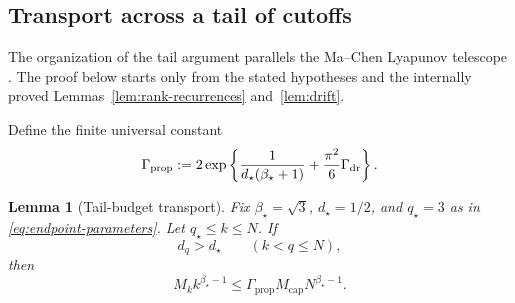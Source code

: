 \documentclass[11pt]{article}
\newtheorem{lemma}[theorem]{Lemma}
\theoremstyle{definition}
\theoremstyle{remark}
\newcommand{\rankmass}{M}
\newcommand{\rankdens}{d}
\newcommand{\criticalexp}{\beta_{\star}}
\newcommand{\threshold}{d_{\star}}
\newcommand{\rankcut}{q_{\star}}
\newcommand{\propconst}{\Gamma_{\mathrm{prop}}}
\begin{document}
\subsection{Transport across a tail of cutoffs}

The organization of the tail argument parallels the Ma--Chen Lyapunov
telescope \cite[Lemma~6.4]{machen2026}.  The proof below starts only from the
stated hypotheses and the internally proved Lemmas~\ref{lem:rank-recurrences}
and~\ref{lem:drift}.

Define the finite universal constant
\begin{equation}
 \propconst
 :=
 2\exp\left\{
 \frac1{\threshold(\criticalexp+1)}
 +\frac{\pi^2}{6}\Gamma_{\rm dr}
 \right\}.
 \label{eq:Ktriangle}
\end{equation}

\begin{lemma}[Tail-budget transport]
\label{lem:propagation}
Fix \(\criticalexp=\sqrt3\), \(\threshold=1/2\), and \(\rankcut=3\) as in
\eqref{eq:endpoint-parameters}.  Let \(\rankcut\le k\le N\).  If
\[
 \rankdens_q>\threshold\qquad(k<q\le N),
\]
then
\begin{equation}
 \rankmass_k k^{\criticalexp-1}
 \le\propconst\rankmass_{\mathrm{cap}}N^{\criticalexp-1}.
 \label{eq:propagation}
\end{equation}
\end{lemma}
\end{document}
